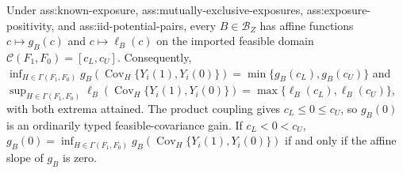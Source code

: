 Under ass:known-exposure, ass:mutually-exclusive-exposures, ass:exposure-positivity, and ass:iid-potential-pairs, every \(B\in\mathcal B_Z\) has affine functions \(c\mapsto g_B(c)\) and \(c\mapsto\ell_B(c)\) on the imported feasible domain \(\mathcal C(F_1,F_0)=[c_L,c_U]\). Consequently, \(\inf_{H\in\Gamma(F_1,F_0)}g_B(\operatorname{Cov}_H\{Y_i(1),Y_i(0)\})=\min\{g_B(c_L),g_B(c_U)\}\) and \(\sup_{H\in\Gamma(F_1,F_0)}\ell_B(\operatorname{Cov}_H\{Y_i(1),Y_i(0)\})=\max\{\ell_B(c_L),\ell_B(c_U)\}\), with both extrema attained. The product coupling gives \(c_L\le0\le c_U\), so \(g_B(0)\) is an ordinarily typed feasible-covariance gain. If \(c_L<0<c_U\), \(g_B(0)=\inf_{H\in\Gamma(F_1,F_0)}g_B(\operatorname{Cov}_H\{Y_i(1),Y_i(0)\})\) if and only if the affine slope of \(g_B\) is zero.
